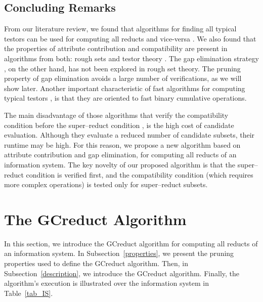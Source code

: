 \documentclass[authoryear,preprint,review,12pt]{elsarticle}
\begin{document}
 \subsection{Concluding Remarks} 
  From our literature review, we found that algorithms for finding all typical testors can be used for computing all reducts and vice-versa \citep{Lazo15}. We also found that the properties of attribute contribution and compatibility are present in algorithms from both: rough sets \citep{WangP07} and testor theory \citep{Sanchez10,Lias13}. The gap elimination strategy \citep{Santiesteban03,Lias13}, on the other hand, has not been explored in rough set theory. The pruning property of gap elimination avoids a large number of verifications, as we will show later. Another important characteristic of fast algorithms for computing typical testors \citep{Sanchez10,Lias13}, is that they are oriented to fast binary cumulative operations. 
  
  The main disadvantage of those algorithms that verify the compatibility condition before the super--reduct condition \citep{Santiesteban03,WangP07,Lias13}, is the high cost of candidate evaluation. Although they evaluate a reduced number of candidate subsets, their runtime may be high. For this reason, we propose a new algorithm based on attribute contribution and gap elimination, for computing all reducts of an information system. The key novelty of our proposed algorithm is that the super--reduct condition is verified first, and the compatibility condition (which requires more complex operations) is tested only for super--reduct subsets.
  
  
\section{The GCreduct Algorithm}\label{GCreduct}
  In this section, we introduce the GCreduct algorithm for computing all reducts of an information system. In  Subsection~\ref{properties}, we present the pruning properties used to define the GCreduct algorithm. Then, in Subsection~\ref{description}, we introduce the GCreduct algorithm. Finally, the algorithm's execution is illustrated over the information system in Table~\ref{tab_IS}.
  
\end{document}
